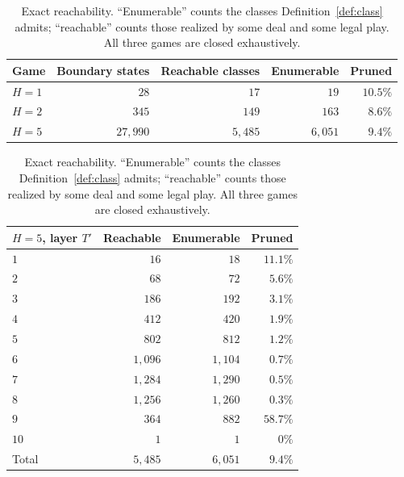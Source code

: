 \documentclass[11pt]{article}
\theoremstyle{plain}
\theoremstyle{definition}
\theoremstyle{remark}
\begin{document}
\begin{table}[t]
\centering
\caption{Exact reachability. ``Enumerable'' counts the classes
Definition~\ref{def:class} admits; ``reachable'' counts those realized by
some deal and some legal play. All three games are closed exhaustively.}
\label{tab:reach}
\begin{tabular}{@{}lrrrr@{}}
\toprule
Game & Boundary states & Reachable classes & Enumerable & Pruned\\
\midrule
$H=1$ & $28$      & $17$      & $19$      & $10.5\%$\\
$H=2$ & $345$     & $149$     & $163$     & $8.6\%$\\
$H=5$ & $27{,}990$ & $5{,}485$ & $6{,}051$ & $9.4\%$\\
\bottomrule
\end{tabular}

\vspace{9pt}

\begin{tabular}{@{}lrrr@{}}
\toprule
$H=5$, layer $T'$ & Reachable & Enumerable & Pruned\\
\midrule
$1$  & $16$      & $18$      & $11.1\%$\\
$2$  & $68$      & $72$      & $5.6\%$\\
$3$  & $186$     & $192$     & $3.1\%$\\
$4$  & $412$     & $420$     & $1.9\%$\\
$5$  & $802$     & $812$     & $1.2\%$\\
$6$  & $1{,}096$ & $1{,}104$ & $0.7\%$\\
$7$  & $1{,}284$ & $1{,}290$ & $0.5\%$\\
$8$  & $1{,}256$ & $1{,}260$ & $0.3\%$\\
$9$  & $364$     & $882$     & $\mathbf{58.7\%}$\\
$10$ & $1$       & $1$       & $0\%$\\
\midrule
Total & $5{,}485$ & $6{,}051$ & $9.4\%$\\
\bottomrule
\end{tabular}
\end{table}
\end{document}
